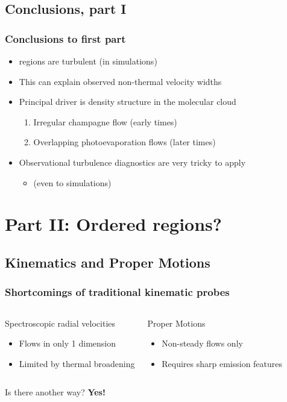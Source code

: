 \documentclass[presentation]{beamer}
\begin{document}
\subsection{Conclusions, part I}

\begin{frame}
  \frametitle{Conclusions to first part}
  \renewcommand\baselinestretch{1.5}\par
  \begin{itemize}
  \item \hii{} regions are turbulent (in simulations)
  \item This can explain observed non-thermal velocity widths
  \item Principal driver is density structure in the molecular cloud
    \begin{enumerate}
    \item Irregular champagne flow (early times)
    \item Overlapping photoevaporation flows (later times)
    \end{enumerate}
  \item Observational turbulence diagnostics are very tricky to apply
    \begin{itemize}
    \item (even to simulations)
    \end{itemize}
  \end{itemize}
\end{frame}


\section{Part II: Ordered \hii{} regions?}

\subsection{Kinematics and Proper Motions}
\begin{frame}
  \frametitle{Shortcomings of traditional kinematic probes}
  \begin{columns}
    \begin{block}{Spectroscopic radial velocities}
      \begin{itemize}
      \item Flows in only 1 dimension
      \item Limited by thermal broadening
      \end{itemize}
    \end{block}
    \begin{block}{Proper Motions}
      \begin{itemize}
      \item Non-steady flows only
      \item Requires sharp emission features
      \end{itemize}
    \end{block}
  \end{columns}
  \begin{block}{Is there another way?}
    \textbf{Yes!}
  \end{block}
\end{frame}
\end{document}
